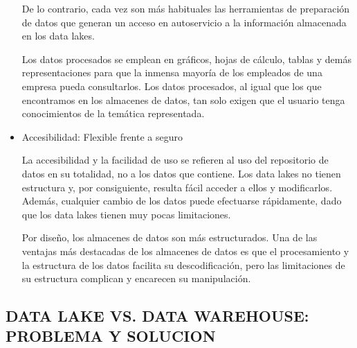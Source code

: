 \documentclass[preprint,12pt]{elsarticle}
\begin{document}
\begin{itemize}
De lo contrario, cada vez son más habituales las herramientas de preparación de datos que generan un acceso en autoservicio a la información almacenada en los data lakes.

Los datos procesados se emplean en gráficos, hojas de cálculo, tablas y demás representaciones para que la inmensa mayoría de los empleados de una empresa pueda consultarlos. Los datos procesados, al igual que los que encontramos en los almacenes de datos, tan solo exigen que el usuario tenga conocimientos de la temática representada.

\item Accesibilidad: Flexible frente a seguro

La accesibilidad y la facilidad de uso se refieren al uso del repositorio de datos en su totalidad, no a los datos que contiene. Los data lakes no tienen estructura y, por consiguiente, resulta fácil acceder a ellos y modificarlos. Además, cualquier cambio de los datos puede efectuarse rápidamente, dado que los data lakes tienen muy pocas limitaciones.

Por diseño, los almacenes de datos son más estructurados. Una de las ventajas más destacadas de los almacenes de datos es que el procesamiento y la estructura de los datos facilita su descodificación, pero las limitaciones de su estructura complican y encarecen su manipulación.

\end{itemize}

\subsection{DATA LAKE VS. DATA WAREHOUSE: PROBLEMA Y SOLUCION}	
\end{document}
